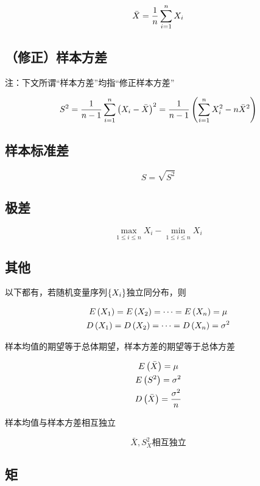 \documentclass{article}
\begin{document}
\[\bar X=\frac1n\sum\limits_{i=1}^n X_i\]

\subsection{（修正）样本方差}

注：下文所谓“样本方差”均指“修正样本方差”

\[S^2=\frac1{n-1}\sum\limits_{i=1}^n{\left(X_i-\bar X\right)}^2=\frac1{n-1}\left(\sum\limits_{i=1}^n X_i^2-n\bar X^2\right)\]

\subsection{样本标准差}

\[S=\sqrt{S^2}\]

\subsection{极差}

\[\max_{1\leqslant i\leqslant n}X_i-\min_{1\leqslant i\leqslant n}X_i\]

\subsection{其他}

以下都有，若随机变量序列$\left\{X_i\right\}$独立同分布，则

\[\begin{gathered}
        E\left(X_1\right)=E\left(X_2\right)=\cdots=E\left(X_n\right)=\mu\\
        D\left(X_1\right)=D\left(X_2\right)=\cdots=D\left(X_n\right)=\sigma^2
    \end{gathered}\]

样本均值的期望等于总体期望，样本方差的期望等于总体方差

\[\begin{gathered}
        E\left(\bar X\right)=\mu\\
        E\left(S^2\right)=\sigma^2\\
        D\left(\bar X\right)=\frac{\sigma^2}n
    \end{gathered}\]

样本均值与样本方差相互独立

\[\bar X,S_X^2\text{相互独立}\]

\subsection{矩}
\end{document}
